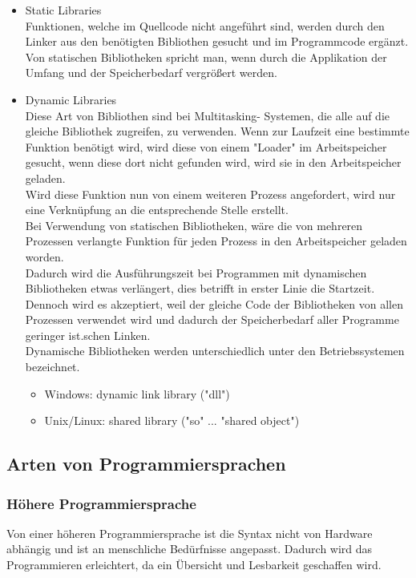 \documentclass[12pt,a4paper]{report}
\begin{document}
\begin{itemize}
\item Static Libraries\\
Funktionen, welche im Quellcode nicht angeführt sind, werden durch den Linker aus den benötigten Bibliothen gesucht und im Programmcode ergänzt.
\\Von statischen Bibliotheken spricht man, wenn durch die Applikation der Umfang und der Speicherbedarf vergrößert werden.
\item Dynamic Libraries\\
Diese Art von Bibliothen sind bei Multitasking- Systemen, die alle auf die gleiche Bibliothek zugreifen, zu verwenden. Wenn zur Laufzeit eine bestimmte Funktion benötigt wird, wird diese von einem "{}Loader"{} im Arbeitspeicher gesucht, wenn diese dort nicht gefunden wird, wird sie in den Arbeitspeicher geladen.
\\Wird diese Funktion nun von einem weiteren Prozess angefordert, wird nur eine Verknüpfung an die entsprechende Stelle erstellt.\\

Bei Verwendung von statischen Bibliotheken, wäre die von mehreren Prozessen verlangte Funktion für jeden Prozess in den Arbeitspeicher geladen worden.\\

Dadurch wird die Ausführungszeit bei Programmen mit dynamischen Bibliotheken etwas verlängert, dies betrifft in erster Linie die Startzeit. Dennoch wird es akzeptiert, weil der gleiche Code der Bibliotheken von allen Prozessen verwendet wird und dadurch der Speicherbedarf aller Programme geringer ist.schen Linken.
\\Dynamische Bibliotheken werden unterschiedlich unter den Betriebssystemen bezeichnet.
\begin{itemize}
\item Windows: dynamic link library ("{}dll"{})
\item Unix/Linux: shared library ("{}so"{} ... "{}shared object"{})
\end{itemize}

\end{itemize}

\subsection{Arten von Programmiersprachen}
\subsubsection{Höhere Programmiersprache} 
Von einer höheren Programmiersprache ist die Syntax nicht von Hardware abhängig und ist an menschliche Bedürfnisse angepasst. Dadurch wird das Programmieren erleichtert, da ein Übersicht und Lesbarkeit geschaffen wird.
\end{document}
